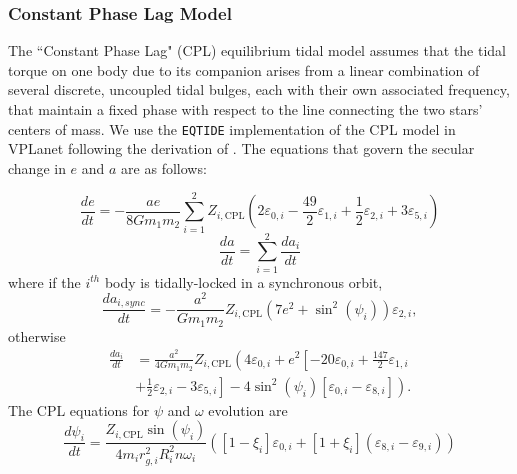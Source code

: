 \documentclass[twocolumn]{aastex61}
\newcommand{\eqtide}[0]{\texttt{EQTIDE}\xspace}
\begin{document}
\subsubsection{Constant Phase Lag Model}

The ``Constant Phase Lag" (CPL) \citep[][]{FerrazMello2008,Heller2011} equilibrium tidal model assumes that the tidal torque on one body due to its companion arises from a linear combination of several discrete, uncoupled tidal bulges, each with their own associated frequency, that maintain a fixed phase with respect to the line connecting the two stars' centers of mass. We use the \eqtide implementation of the CPL model in VPLanet following the derivation of \citet{FerrazMello2008}.  The equations that govern the secular change in $e$ and $a$ are as follows:

\begin{equation} \label{eqn:cpl:e}
\frac{de}{dt} = -\frac{ae}{8 G m_1 m_2} \sum_{i=1}^2 Z_{i,\mathrm{CPL}} \left( 2 \varepsilon_{0,i} - \frac{49}{2} \varepsilon_{1,i} + \frac{1}{2} \varepsilon_{2,i} + 3 \varepsilon_{5,i} \right)
\end{equation}
\begin{equation} \label{eqn:cpl:a}
\frac{da}{dt} = \sum_{i=1}^2 \frac{da_i}{dt}
\end{equation}
where if the $i^{th}$ body is tidally-locked in a synchronous orbit,
\begin{equation} \label{eqn:cpl:dadt_locked}
\frac{da_{i,sync}}{dt} = -\frac{a^2}{G m_1 m_2} Z_{i,\mathrm{CPL}} \left( 7 e^2 + \sin^2 (\psi_i) \right) \varepsilon_{2,i},
\end{equation}
otherwise
\begin{equation}
\begin{split}
\frac{da_i}{dt} & = \frac{a^2}{4 G m_1 m_2} Z_{i,\mathrm{CPL}} \left( 4 \varepsilon_{0,i} + e^2 \left[ -20 \varepsilon_{0,i} + \frac{147}{2} \varepsilon_{1,i} \right. \right. \\
&  + \left. \left. \frac{1}{2} \varepsilon_{2,i} - 3 \varepsilon_{5,i} \right] - 4 \sin^2 (\psi_i) \left[ \varepsilon_{0,i} - \varepsilon_{8,i} \right] \right).
\end{split}
\end{equation}
The CPL equations for $\psi$ and $\omega$ evolution are
\begin{equation} \label{eqn:cpl:psi}
\frac{d\psi_i}{dt} = \frac{Z_{i,\mathrm{CPL}} \sin(\psi_i)}{4 m_i r_{g,i}^2 R_i^2 n \omega_i} \left( [1-\xi_i] \varepsilon_{0,i} + [1+\xi_i](\varepsilon_{8,i} - \varepsilon_{9,i}) \right)
\end{equation}
\end{document}
